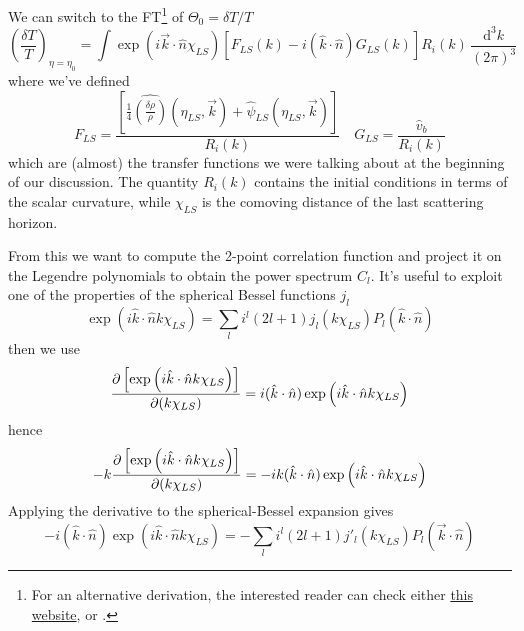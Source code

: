 \par We can switch to the FT\footnote{For an alternative derivation, the interested reader can check either \href{https://cmb.wintherscoming.no/milestone4.php}{this website}, or \cite{callin2006}.} of $\Theta_{0} = \delta T/T$
\begin{equation}
    \left(\frac{\delta T}{T}\right)_{\eta = \eta_{0}} = \int \exp\left(i\vec{k}\cdot\hat{n}\chi_{LS}\right)\left[F_{LS}(k)-i(\hat{k}\cdot\hat{n})G_{LS}(k)\right]R_{i}(k)\,\frac{\text{d}^{3}k}{(2\pi)^{3}}
\end{equation}
where we've defined 
\begin{equation}
    F_{LS} = \frac{\left[\frac{1}{4}\widehat{\left(\frac{\delta\rho}{\rho}\right)}(\eta_{LS}, \vec{k}) + \hat{\psi}_{LS}(\eta_{LS}, \vec{k})\right]}{R_{i}(k)} \quad G_{LS} = \frac{\hat{v}_{b}}{R_{i}(k)}
\end{equation}
which are (almost) the transfer functions we were talking about at the beginning of our discussion. The quantity $R_{i}(k)$ contains the initial conditions in terms of the scalar curvature, while $\chi_{LS}$ is the comoving distance of the last scattering horizon.
\par From this we want to compute the 2-point correlation function and project it on the Legendre polynomials to obtain the power spectrum $C_{l}$. It's useful to exploit one of the properties of the spherical Bessel functions $j_{l}$
\begin{equation}
    \exp\left(i\hat{k}\cdot\hat{n}k\chi_{LS}\right) = \sum_{l}i^{l}(2l+1)j_{l}(k\chi_{LS})P_{l}(\hat{k}\cdot\hat{n})
\end{equation}
then we use 
\begin{equation}
    \frac{\partial \left[\exp\left({i\hat{k}\cdot\hat{n}k\chi_{LS}}\right)\right]}{\partial (k\chi_{LS})} = i(\hat{k}\cdot\hat{n})\exp\left({i\hat{k}\cdot\hat{n}k\chi_{LS}}\right)
\end{equation}
hence
\begin{equation}
    -k\frac{\partial \left[\exp\left({i\hat{k}\cdot\hat{n}k\chi_{LS}}\right)\right]}{\partial (k\chi_{LS})} = -ik(\hat{k}\cdot\hat{n})\exp\left({i\hat{k}\cdot\hat{n}k\chi_{LS}}\right)
\end{equation}
Applying the derivative to the spherical-Bessel expansion gives
\begin{equation}
    -i(\hat{k}\cdot\hat{n})\exp\left({i\hat{k}\cdot\hat{n}k\chi_{LS}}\right) = -\sum_{l}i^{l}(2l+1)j'_{l}(k\chi_{LS})P_{l}(\vec{k}\cdot\hat{n})
\end{equation}
